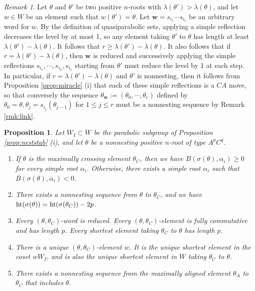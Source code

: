\documentclass[11pt]{amsart}
\theoremstyle{plain}
\newtheorem{prop}[theorem]{Proposition}
\theoremstyle{definition}
\theoremstyle{remark}
\newtheorem{rmk}[theorem]{Remark}
\numberwithin{equation}{subsection}
\newcommand{\al}{\alpha}
\newcommand{\bfw}{\mathbf{w}}
\newcommand{\rootht}{\text{\rm ht}}
\begin{document}
\begin{rmk}
    \label{rmk:rigid}
Let $\theta$ and $\theta'$ be two positive $n$-roots with
$\lambda(\theta')>\lambda(\theta)$, and let $w\in W$ be an element such that
$w(\theta')=\theta$. Let $\bfw=s_{i_1}\cdots s_{i_r}$ be an arbitrary word for
$w$. By the definition of quasiparabolic sets, applying a simple reflection
decreases the level by at most 1, so any element taking $\theta'$ to $\theta$
has length at least $\lambda(\theta')-\lambda(\theta)$. It follows that $r\ge
\lambda(\theta')-\lambda(\theta)$. It also follows that if
$r=\lambda(\theta')-\lambda(\theta)$, then $\bfw$ is reduced and successively
applying the simple reflections $s_{i_r}, \cdots, s_{i_2}, s_{i_1}$ starting
from $\theta'$ must reduce the level by 1 at each step. In particular, if
$r=\lambda(\theta')-\lambda(\theta)$ and $\theta'$ is nonnesting, then it
follows from Proposition \ref{prop:miracle} (i) that each of these simple
reflections is a $CA$ move, so that conversely the sequence
$\theta_\bfw:=(\theta_0,\cdots, \theta_r)$ defined by $\theta_0=\theta,
\theta_j=s_{i_j}(\theta_{j-1})$ for $1\le j\le r$ must be a nonnesting sequence
by Remark \ref{rmk:link}.
\end{rmk}

\begin{prop}\label{prop:nestchain}
Let $W_I\subset W$ be the
parabolic subgroup of Proposition \ref{prop:neststab} (i), and let $\theta$ be a
nonnesting positive $n$-root of type $A^pC^q$.
\begin{enumerate}
    \item[{\rm (i)}] If $\theta$ is the maximally crossing element $\theta_C$,
             then  we have $B(\sigma(\theta), \al_i)\ge 0$ for every simple root
             $\al_i$. Otherwise, there exists a simple root $\al_i$ such that
             $B(\sigma(\theta), \al_i)<0$.
         \item[{\rm (ii)}] There exists a nonnesting sequence from $\theta$ to
          $\theta_C$, and we have
          $\rootht(\sigma(\theta))=\rootht(\sigma(\theta_C))-2p$.

      \item[{\rm (iii)}]{Every $(\theta,\theta_C)$-word is reduced. Every
      $(\theta,\theta_C)$-element is fully commutative and has length $p$. Every
  shortest element taking $\theta_C$ to $\theta$ has length $p$.}

\item[{\rm (iv)}]{There is a unique
$(\theta,\theta_C)$-element $w$. It is
        the unique shortest element in the coset $wW_I$, and is also
    the unique shortest element in $W$ taking $\theta_C$ to $\theta$.}


\item[{\rm (v)}] There exists a nonnesting sequence from the maximally aligned
        element $\theta_A$ to $\theta_C$ that includes $\theta$.
\end{enumerate}
\end{prop}
\end{document}
